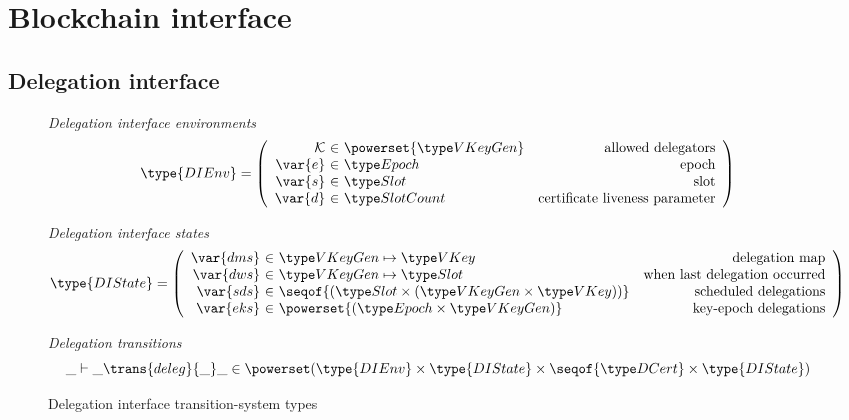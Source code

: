 \section{Blockchain interface}
\label{sec:blockchain-interface}

\newcommand{\DIEnv}{\type{DIEnv}}
\newcommand{\DIState}{\type{DIState}}

\newcommand{\UPIEnv}{\type{UPIEnv}}
\newcommand{\UPIState}{\type{UPIState}}

\subsection{Delegation interface}
\label{sec:delegation-interface}

\begin{figure}[htb]
  \emph{Delegation interface environments}
  \begin{equation*}
    \DIEnv =
    \left(
      \begin{array}{r@{~\in~}lr}
        \mathcal{K} & \powerset{\VKeyGen} & \text{allowed delegators}\\
        \var{e} & \Epoch & \text{epoch}\\
        \var{s} & \Slot & \text{slot}\\
        \var{d} & \SlotCount & \text{certificate liveness parameter}
      \end{array}
    \right)
  \end{equation*}

  \emph{Delegation interface states}
  \begin{equation*}
    \DIState
    = \left(
      \begin{array}{r@{~\in~}lr}
        \var{dms} & \VKeyGen \mapsto \VKey & \text{delegation map}\\
        \var{dws} & \VKeyGen \mapsto \Slot & \text{when last delegation occurred}\\
        \var{sds} & \seqof{(\Slot \times (\VKeyGen \times \VKey))} & \text{scheduled delegations}\\
        \var{eks} & \powerset{(\Epoch \times \VKeyGen)} & \text{key-epoch delegations}
      \end{array}
    \right)
  \end{equation*}

  \emph{Delegation transitions}
  \begin{equation*}
    \_ \vdash \_ \trans{deleg}{\_} \_ \in
    \powerset (\DIEnv \times \DIState \times \seqof{\DCert} \times \DIState)
  \end{equation*}
  \caption{Delegation interface transition-system types}
  \label{fig:ts-types:delegation-interface}
\end{figure}

